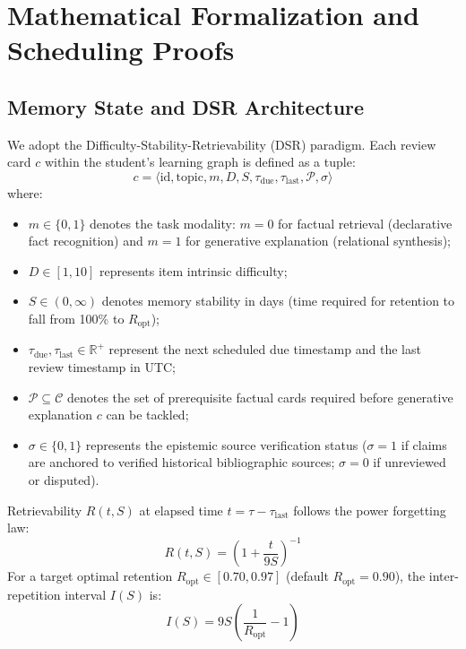 \documentclass[11pt,a4paper]{article}
\begin{document}
\section{Mathematical Formalization and Scheduling Proofs}
\label{sec:formalization}

\subsection{Memory State and DSR Architecture}
We adopt the Difficulty-Stability-Retrievability (DSR) paradigm. Each review card $c$ within the student's learning graph is defined as a tuple:
\begin{equation}
    c = \langle \text{id}, \text{topic}, m, D, S, \tau_{\text{due}}, \tau_{\text{last}}, \mathcal{P}, \sigma \rangle
\end{equation}
where:
\begin{itemize}[leftmargin=*]
    \item $m \in \{0, 1\}$ denotes the task modality: $m=0$ for factual retrieval (declarative fact recognition) and $m=1$ for generative explanation (relational synthesis);
    \item $D \in [1, 10]$ represents item intrinsic difficulty;
    \item $S \in (0, \infty)$ denotes memory stability in days (time required for retention to fall from 100\% to $R_{\text{opt}}$);
    \item $\tau_{\text{due}}, \tau_{\text{last}} \in \mathbb{R}^+$ represent the next scheduled due timestamp and the last review timestamp in UTC;
    \item $\mathcal{P} \subseteq \mathcal{C}$ denotes the set of prerequisite factual cards required before generative explanation $c$ can be tackled;
    \item $\sigma \in \{0, 1\}$ represents the epistemic source verification status ($\sigma=1$ if claims are anchored to verified historical bibliographic sources; $\sigma=0$ if unreviewed or disputed).
\end{itemize}

Retrievability $R(t, S)$ at elapsed time $t = \tau - \tau_{\text{last}}$ follows the power forgetting law:
\begin{equation}
    \label{eq:retrievability}
    R(t, S) = \left( 1 + \frac{t}{9S} \right)^{-1}
\end{equation}
For a target optimal retention $R_{\text{opt}} \in [0.70, 0.97]$ (default $R_{\text{opt}} = 0.90$), the inter-repetition interval $I(S)$ is:
\begin{equation}
    \label{eq:interval}
    I(S) = 9S \left( \frac{1}{R_{\text{opt}}} - 1 \right)
\end{equation}
\end{document}

